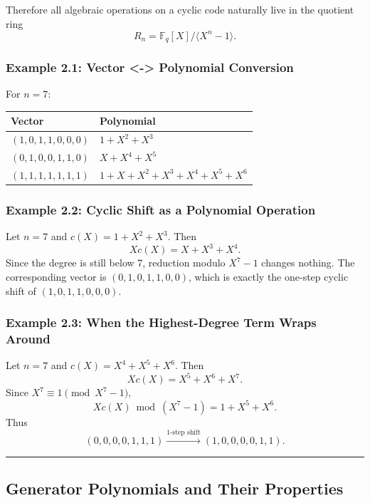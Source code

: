 \documentclass[
]{article}
\begin{document}
Therefore all algebraic operations on a cyclic code naturally live in
the quotient ring \[R_n = \mathbb{F}_q[X]/\langle X^n-1 \rangle.\]

\subsubsection{Example 2.1: Vector \textless-\textgreater{} Polynomial
Conversion}\label{example-2.1-vector---polynomial-conversion}

For \(n=7\):

\begin{longtable}[]{@{}ll@{}}
\toprule\noalign{}
Vector & Polynomial \\
\midrule\noalign{}
\endhead
\bottomrule\noalign{}
\endlastfoot
\((1,0,1,1,0,0,0)\) & \(1+X^2+X^3\) \\
\((0,1,0,0,1,1,0)\) & \(X+X^4+X^5\) \\
\((1,1,1,1,1,1,1)\) & \(1+X+X^2+X^3+X^4+X^5+X^6\) \\
\end{longtable}

\subsubsection{Example 2.2: Cyclic Shift as a Polynomial
Operation}\label{example-2.2-cyclic-shift-as-a-polynomial-operation}

Let \(n=7\) and \(c(X)=1+X^2+X^3\). Then \[Xc(X)=X+X^3+X^4.\] Since the
degree is still below 7, reduction modulo \(X^7-1\) changes nothing. The
corresponding vector is \((0,1,0,1,1,0,0)\), which is exactly the
one-step cyclic shift of \((1,0,1,1,0,0,0)\).

\subsubsection{Example 2.3: When the Highest-Degree Term Wraps
Around}\label{example-2.3-when-the-highest-degree-term-wraps-around}

Let \(n=7\) and \(c(X)=X^4+X^5+X^6\). Then \[Xc(X)=X^5+X^6+X^7.\] Since
\(X^7 \equiv 1 \pmod{X^7-1}\), \[Xc(X) \bmod (X^7-1)=1+X^5+X^6.\] Thus
\[(0,0,0,0,1,1,1) \xrightarrow{\text{1-step shift}} (1,0,0,0,0,1,1).\]

\begin{center}\rule{0.5\linewidth}{0.5pt}\end{center}

\subsection{Generator Polynomials and Their Properties}\label{what-is-a-generator-polynomial-and-what-properties-does-it-have}
\end{document}
